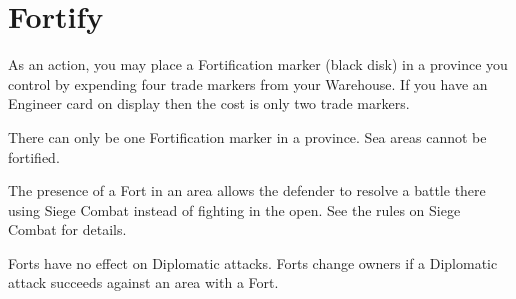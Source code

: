 \section{Fortify}

As an action, you may place a Fortification marker (black disk) in a province you control by expending four trade markers from your Warehouse. If you have an Engineer card on display then the cost is only two trade markers.

There can only be one Fortification marker in a province. Sea areas cannot be fortified.

The presence of a Fort in an area allows the defender to resolve a battle there using Siege Combat instead of fighting in the open. See the rules on Siege Combat for details.

Forts have no effect on Diplomatic attacks. Forts change owners if a Diplomatic attack succeeds against an area with a Fort.